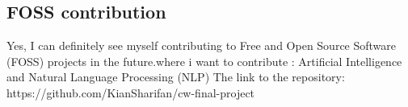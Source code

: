\documentclass{article}
\begin{document}
\subsection{FOSS contribution}
Yes, I can definitely see myself contributing to Free and Open Source Software (FOSS) projects in the future.where i want to contribute : Artificial Intelligence and Natural Language Processing (NLP)
\newline
\newline
The link to the repository:\newline
\large{https://github.com/KianSharifan/cw-final-project}
\end{document}
